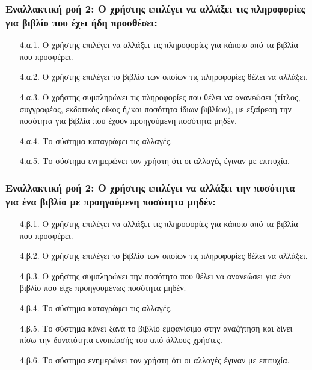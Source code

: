 \documentclass[12pt,a4paper]{article}
\begin{document}
\subsubsection*{Εναλλακτική ροή 2: Ο χρήστης επιλέγει να αλλάξει τις πληροφορίες για βιβλίο που έχει ήδη προσθέσει:}
\begin{enumerate}
    \item [4.α.1.] Ο χρήστης επιλέγει να αλλάξει τις πληροφορίες για κάποιο από τα βιβλία που προσφέρει.
    \item [4.α.2.] Ο χρήστης επιλέγει το βιβλίο των οποίων τις πληροφορίες θέλει να αλλάξει.

    \item [4.α.3.] Ο χρήστης συμπληρώνει τις πληροφορίες που θέλει να ανανεώσει (τίτλος, συγγραφέας, εκδοτικός οίκος ή/και ποσότητα ίδιων βιβλίων), με εξαίρεση την ποσότητα για βιβλία που έχουν προηγούμενη ποσότητα μηδέν.

    \item [4.α.4.] Το σύστημα καταγράφει τις αλλαγές.
    \item [4.α.5.] Το σύστημα ενημερώνει τον χρήστη ότι οι αλλαγές έγιναν με επιτυχία.
\end{enumerate}

\subsubsection*{Εναλλακτική ροή 2: Ο χρήστης επιλέγει να αλλάξει την ποσότητα για ένα βιβλίο με προηγούμενη ποσότητα μηδέν:}
\begin{enumerate}
    \item [4.β.1.] Ο χρήστης επιλέγει να αλλάξει τις πληροφορίες για κάποιο από τα βιβλία που προσφέρει.
    \item [4.β.2.] Ο χρήστης επιλέγει το βιβλίο των οποίων τις πληροφορίες θέλει να αλλάξει.

    \item [4.β.3.] Ο χρήστης συμπληρώνει την ποσότητα που θέλει να ανανεώσει για ένα βιβλίο που είχε προηγουμένως ποσότητα μηδέν. 

    \item [4.β.4.] Το σύστημα καταγράφει τις αλλαγές.
    \item [4.β.5.] Το σύστημα κάνει ξανά το βιβλίο εμφανίσιμο στην αναζήτηση και δίνει πίσω την δυνατότητα ενοικίασής του από άλλους χρήστες.
    \item [4.β.6.] Το σύστημα ενημερώνει τον χρήστη ότι οι αλλαγές έγιναν με επιτυχία.
\end{enumerate}
\end{document}
